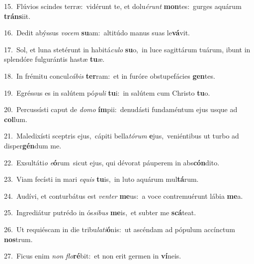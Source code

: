 {\numbfont\textcolor{\numbcolor}{15.}}~Flúvios scindes terræ:~\dagger vidérunt te, et dolu\-\textit{é}\-\textit{runt} \textbf{mon}\-tes:~\star gurges aquárum \textbf{tráns}\-iit.\par
{\numbfont\textcolor{\numbcolor}{16.}}~Dedit abýssus \textit{vo}\-\textit{cem} \textbf{su}\-am:~\star altitúdo manus suas le\-\textbf{vá}\-vit.\par
{\numbfont\textcolor{\numbcolor}{17.}}~Sol, et luna stetérunt in habitá\-\textit{cu}\-\textit{lo} \textbf{su}\-o,~\star in luce sagittárum tuárum, ibunt in splendóre fulgurántis hastæ \textbf{tu}\-æ.\par
{\numbfont\textcolor{\numbcolor}{18.}}~In frémitu concul\-\textit{cá}\-\textit{bis} \textbf{ter}\-ram:~\star et in furóre obstupefácies \textbf{gen}\-tes.\par
{\numbfont\textcolor{\numbcolor}{19.}}~Egréssus es in salútem pó\-\textit{pu}\-\textit{li} \textbf{tu}\-i:~\star in salútem cum Christo \textbf{tu}\-o.\par
{\numbfont\textcolor{\numbcolor}{20.}}~Percussísti caput de \textit{do}\-\textit{mo} \textbf{ím}\-pii:~\star denudásti fundaméntum ejus usque ad \textbf{col}\-lum.\par
{\numbfont\textcolor{\numbcolor}{21.}}~Maledixísti sceptris ejus,~\dagger cápiti bella\-\textit{tó}\-\textit{rum} \textbf{e}\-jus,~\star veniéntibus ut turbo ad disper\-\textbf{gén}\-dum me.\par
{\numbfont\textcolor{\numbcolor}{22.}}~Exsultáti\textit{o} \textit{e}\-\textbf{ó}rum~\star sicut ejus, qui dévorat páuperem in abs\-\textbf{cón}\-dito.\par
{\numbfont\textcolor{\numbcolor}{23.}}~Viam fecísti in mari \textit{e}\-\textit{quis} \textbf{tu}\-is,~\star in luto aquárum mul\-\textbf{tá}\-rum.\par
{\numbfont\textcolor{\numbcolor}{24.}}~Audívi, et conturbátus est \textit{ven}\-\textit{ter} \textbf{me}\-us:~\star a voce contremuérunt lábia \textbf{me}\-a.\par
{\numbfont\textcolor{\numbcolor}{25.}}~Ingrediátur putrédo in ós\-\textit{si}\-\textit{bus} \textbf{me}\-is,~\star et subter me \textbf{scá}\-teat.\par
{\numbfont\textcolor{\numbcolor}{26.}}~Ut requiéscam in die tribu\-\textit{la}\-\textit{ti}\textbf{ó}nis:~\star ut ascéndam ad pópulum accínctum \textbf{nos}\-trum.\par
{\numbfont\textcolor{\numbcolor}{27.}}~Ficus enim \textit{non} \textit{flo}\-\textbf{ré}bit:~\star et non erit germen in \textbf{ví}\-neis.\par
